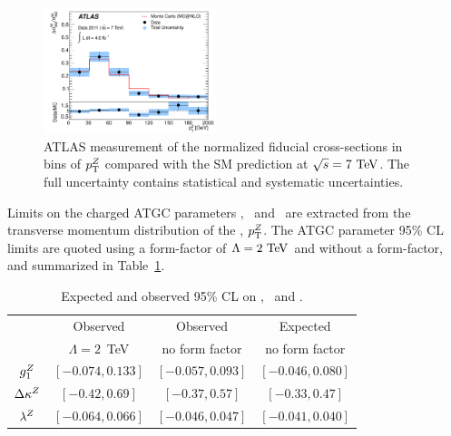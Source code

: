 \begin{figure}[htbp]
  \begin{center}
  \includegraphics[width=0.45\textwidth]{figures/sss-inclboson-diboson-wzprod-ptZ.pdf}
  \caption{ATLAS measurement of the normalized fiducial cross-sections in bins of $p_{\mathrm{T}}^Z$ compared with the SM prediction at $\rts = 7\TeV$. The full uncertainty contains statistical and systematic uncertainties.}
\label{fig:sss-WZprod-ptZ-det}
\end{center}
\end{figure}


Limits on the charged ATGC parameters \dkz, \lz\ and \gz\ are extracted from the transverse momentum distribution
of the \Zboson, $p_{\mathrm{T}}^Z$. The ATGC parameter 95\% CL limits are quoted using a form-factor of $\Lambda=2\TeV$ and without a form-factor, and summarized in Table~\ref{tab:sss-WZprod-ATGC}.


\begin{table}\centering
\caption{Expected and observed 95\% CL on 
\dkz, \lz\ and \gz.}
\label{tab:sss-WZprod-ATGC}
\begin{tabular}{cccc}
\hline
& Observed & Observed & Expected \\
& $\Lambda=2$~TeV & no form factor & no form factor\\
\hline
$g_1^Z$ & $[-0.074, 0.133]$ & $[-0.057, 0.093]$ & $[-0.046, 0.080]$ \\
$\Delta \kappa^Z$ & $[-0.42, 0.69]$ & $[-0.37, 0.57]$ & $[-0.33, 0.47]$ \\
$\lambda^Z$ & $[-0.064, 0.066]$ & $[-0.046, 0.047]$ & $[-0.041, 0.040]$ \\
\hline
\end{tabular}
\end{table}

 










